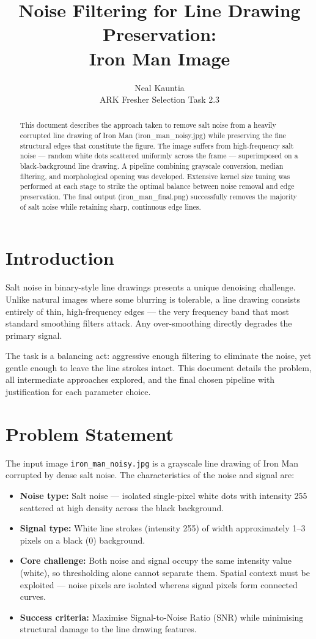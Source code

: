 \documentclass[journal]{IEEEtran}
\title{Noise Filtering for Line Drawing Preservation:\\Iron Man Image}
\author{Neal Kauntia\\ARK Fresher Selection Task 2.3}
\begin{document}
\maketitle

\begin{abstract}
This document describes the approach taken to remove salt noise from a heavily corrupted 
line drawing of Iron Man (iron\_man\_noisy.jpg) while preserving the fine structural edges 
that constitute the figure. The image suffers from high-frequency salt noise — random white 
dots scattered uniformly across the frame — superimposed on a black-background line drawing. 
A pipeline combining grayscale conversion, median filtering, and morphological opening was 
developed. Extensive kernel size tuning was performed at each stage to strike the optimal 
balance between noise removal and edge preservation. The final output (iron\_man\_final.png) 
successfully removes the majority of salt noise while retaining sharp, continuous edge lines.
\end{abstract}

\section{Introduction}
Salt noise in binary-style line drawings presents a unique denoising challenge. Unlike 
natural images where some blurring is tolerable, a line drawing consists entirely of 
thin, high-frequency edges — the very frequency band that most standard smoothing 
filters attack. Any over-smoothing directly degrades the primary signal.

The task is a balancing act: aggressive enough filtering to eliminate the noise, 
yet gentle enough to leave the line strokes intact. This document details the problem, 
all intermediate approaches explored, and the final chosen pipeline with justification 
for each parameter choice.

\section{Problem Statement}
The input image \texttt{iron\_man\_noisy.jpg} is a grayscale line drawing of Iron Man 
corrupted by dense salt noise. The characteristics of the noise and signal are:

\begin{itemize}
    \item \textbf{Noise type:} Salt noise — isolated single-pixel white dots with 
    intensity 255 scattered at high density across the black background.
    \item \textbf{Signal type:} White line strokes (intensity 255) of width 
    approximately 1--3 pixels on a black (0) background.
    \item \textbf{Core challenge:} Both noise and signal occupy the same intensity 
    value (white), so thresholding alone cannot separate them. Spatial context 
    must be exploited — noise pixels are isolated whereas signal pixels form 
    connected curves.
    \item \textbf{Success criteria:} Maximise Signal-to-Noise Ratio (SNR) while 
    minimising structural damage to the line drawing features.
\end{itemize}
\end{document}
